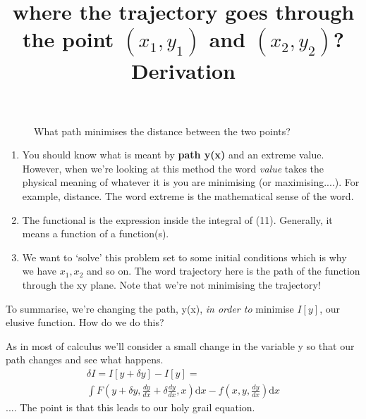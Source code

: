 \begin{figure}[h!]
\title{where the trajectory goes through the point $(x_{1}, y_{1})$ and $(x_{2}, y_{2})$?}
\centering
{}
\caption{What path minimises the distance between the two points?}
\end{figure}
\begin{enumerate}
\item You should know what is meant by \textbf{path y(x)} and an extreme value. However, when we're looking at this method the word \textit{value} takes the physical meaning of whatever it is you are minimising (or maximising....). For example, distance. The word extreme is the mathematical sense of the word.
\item The functional is the expression inside the integral of (11). Generally, it means a function of a function(s). 
\item We want to `solve' this problem set to some initial conditions which is why we have $x_{1}, x_{2}$ and so on. The word trajectory here is the path of the function through the xy plane. Note that we're not minimising the trajectory!
\end{enumerate}
To summarise, we're changing the path, y(x), \textit{in order to} minimise $I[y]$, our elusive function. How do we do this?
\par
\title{\large{\textbf{Derivation}}}
As in most of calculus we'll consider a small change in the variable y so that our path changes and see what happens. \medskip
\begin{equation}
\begin{gathered}
\delta I = I[y +\delta y] - I[y] = \\ 
\int \! F(y + \delta y, \frac{dy}{dx} + \delta \frac{dy}{dx}, x) \textrm{d}x -  f(x, y, \frac{dy}{dx}) \textrm{d}x
\end{gathered}
\end{equation}
....
The point is that this leads to our holy grail equation.




